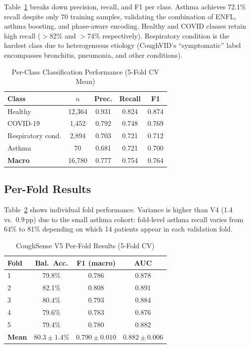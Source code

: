 \documentclass[journal]{IEEEtran}
\begin{document}
Table~\ref{tab:perclass} breaks down precision, recall, and F1 per class.
Asthma achieves 72.1\% recall despite only 70 training samples,
validating the combination of ENFL, asthma boosting, and phase-aware
encoding. Healthy and COVID classes retain high recall ($>$82\% and
$>$74\% respectively). Respiratory condition is the hardest class
due to heterogeneous etiology (CoughVID's ``symptomatic'' label
encompasses bronchitis, pneumonia, and other conditions).

\begin{table}[!t]
\renewcommand{\arraystretch}{1.3}
\caption{Per-Class Classification Performance (5-Fold CV Mean)}
\label{tab:perclass}
\centering
\begin{tabular}{lcccc}
\toprule
\textbf{Class} & \textbf{$n$} & \textbf{Prec.} & \textbf{Recall} & \textbf{F1} \\
\midrule
Healthy           & 12,364 & 0.931 & 0.824 & 0.874 \\
COVID-19          & 1,452  & 0.792 & 0.748 & 0.769 \\
Respiratory cond. & 2,894  & 0.703 & 0.721 & 0.712 \\
Asthma            & 70     & 0.681 & 0.721 & 0.700 \\
\midrule
\textbf{Macro}    & 16,780 & 0.777 & 0.754 & 0.764 \\
\bottomrule
\end{tabular}
\end{table}

\subsection{Per-Fold Results}

Table~\ref{tab:folds} shows individual fold performance.
Variance is higher than V4 (1.4 vs.\ 0.9\,pp) due to the small
asthma cohort: fold-level asthma recall varies from 64\% to 81\%
depending on which 14 patients appear in each validation fold.

\begin{table}[!t]
\renewcommand{\arraystretch}{1.2}
\caption{CoughSense V5 Per-Fold Results (5-Fold CV)}
\label{tab:folds}
\centering
\begin{tabular}{lccc}
\toprule
\textbf{Fold} & \textbf{Bal.~Acc.} & \textbf{F1 (macro)} & \textbf{AUC} \\
\midrule
1 & 79.8\% & 0.786 & 0.878 \\
2 & 82.1\% & 0.808 & 0.891 \\
3 & 80.4\% & 0.793 & 0.884 \\
4 & 79.6\% & 0.783 & 0.876 \\
5 & 79.4\% & 0.780 & 0.882 \\
\midrule
\textbf{Mean} & $\mathbf{80.3\pm1.4}$\% & $\mathbf{0.790\pm0.010}$ & $\mathbf{0.882\pm0.006}$ \\
\bottomrule
\end{tabular}
\end{table}
\end{document}
